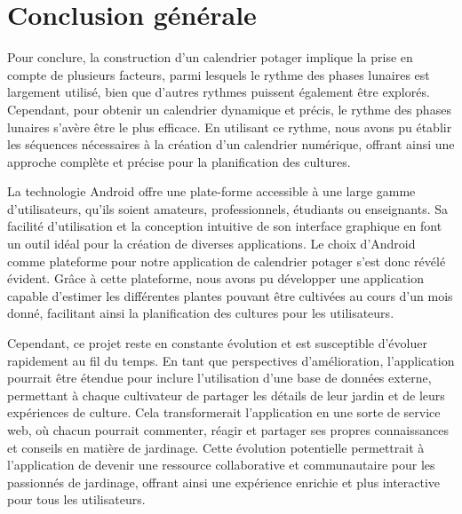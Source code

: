 \chapter*{Conclusion générale}
Pour conclure, la construction d'un calendrier potager implique la prise en compte de plusieurs facteurs, parmi lesquels le rythme des phases lunaires est largement utilisé, bien que d'autres rythmes puissent également être explorés. Cependant, pour obtenir un calendrier dynamique et précis, le rythme des phases lunaires s'avère être le plus efficace. En utilisant ce rythme, nous avons pu établir les séquences nécessaires à la création d'un calendrier numérique, offrant ainsi une approche complète et précise pour la planification des cultures.

La technologie Android offre une plate-forme accessible à une large gamme d'utilisateurs, qu'ils soient amateurs, professionnels, étudiants ou enseignants. Sa facilité d'utilisation et la conception intuitive de son interface graphique en font un outil idéal pour la création de diverses applications. Le choix d'Android comme plateforme pour notre application de calendrier potager s'est donc révélé évident. Grâce à cette plateforme, nous avons pu développer une application capable d'estimer les différentes plantes pouvant être cultivées au cours d'un mois donné, facilitant ainsi la planification des cultures pour les utilisateurs.

Cependant, ce projet reste en constante évolution et est susceptible d'évoluer rapidement au fil du temps. En tant que perspectives d'amélioration, l'application pourrait être étendue pour inclure l'utilisation d'une base de données externe, permettant à chaque cultivateur de partager les détails de leur jardin et de leurs expériences de culture. Cela transformerait l'application en une sorte de service web, où chacun pourrait commenter, réagir et partager ses propres connaissances et conseils en matière de jardinage. Cette évolution potentielle permettrait à l'application de devenir une ressource collaborative et communautaire pour les passionnés de jardinage, offrant ainsi une expérience enrichie et plus interactive pour tous les utilisateurs.



